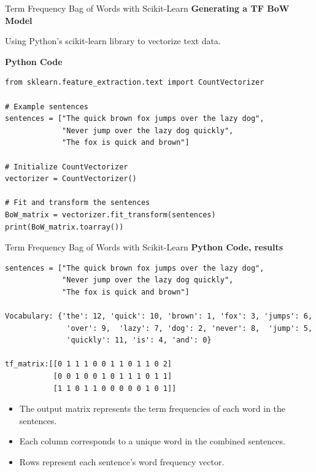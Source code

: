\documentclass{beamer}
\begin{document}
\begin{frame}[fragile]{Term Frequency Bag of Words with Scikit-Learn}
\small
\textbf{Generating a TF BoW Model}

Using Python's scikit-learn library to vectorize text data.

\textbf{Python Code}
\begin{tcolorbox}[colback=lightgray, colframe=lightgray,
                  boxsep=0mm, arc=1mm, boxrule=0mm,
                  left=1mm, right=1mm, top=1mm, bottom=1mm]
\begin{Verbatim}[fontsize=\scriptsize, bgcolor=lightgray]
from sklearn.feature_extraction.text import CountVectorizer

# Example sentences
sentences = ["The quick brown fox jumps over the lazy dog",
             "Never jump over the lazy dog quickly",
             "The fox is quick and brown"]

# Initialize CountVectorizer
vectorizer = CountVectorizer()

# Fit and transform the sentences
BoW_matrix = vectorizer.fit_transform(sentences)
print(BoW_matrix.toarray())
\end{Verbatim}
\end{tcolorbox}

\end{frame}


\begin{frame}[fragile]{Term Frequency Bag of Words with Scikit-Learn}
\small
\textbf{Python Code, results}
\begin{tcolorbox}[colback=lightgray, colframe=lightgray,
                  boxsep=0mm, arc=1mm, boxrule=0mm,
                  left=1mm, right=1mm, top=1mm, bottom=1mm]
\begin{Verbatim}[fontsize=\scriptsize, bgcolor=lightgray]
sentences = ["The quick brown fox jumps over the lazy dog",
             "Never jump over the lazy dog quickly",
             "The fox is quick and brown"]

Vocabulary: {'the': 12, 'quick': 10, 'brown': 1, 'fox': 3, 'jumps': 6,
              'over': 9,  'lazy': 7, 'dog': 2, 'never': 8,  'jump': 5,
              'quickly': 11, 'is': 4, 'and': 0}

tf_matrix:[[0 1 1 1 0 0 1 1 0 1 1 0 2]
           [0 0 1 0 0 1 0 1 1 1 0 1 1]
           [1 1 0 1 1 0 0 0 0 0 1 0 1]]
\end{Verbatim}
\end{tcolorbox}

\begin{itemize}
  \item The output matrix represents the term frequencies of each word in the sentences.
  \item Each column corresponds to a unique word in the combined sentences.
  \item Rows represent each sentence's word frequency vector.
\end{itemize}
\end{frame}
\end{document}
